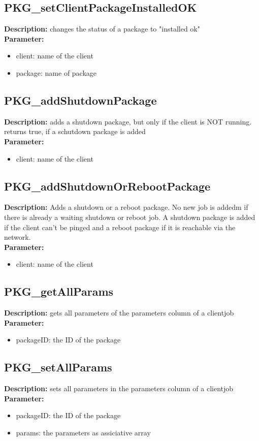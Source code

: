 \subsection{PKG\_setClientPackageInstalledOK}
\textbf{Description:} changes the status of a package to "installed ok"\\
\textbf{Parameter:}
\begin{itemize}
\item client: name of the client
\item package: name of package
\end{itemize}

\subsection{PKG\_addShutdownPackage}
\textbf{Description:} adds a shutdown package, but only if the client is NOT running. returns true, if a schutdown package is added\\
\textbf{Parameter:}
\begin{itemize}
\item client: name of the client
\end{itemize}

\subsection{PKG\_addShutdownOrRebootPackage}
\textbf{Description:} Adds a shutdown or a reboot package. No new job is addedm if there is already a waiting shutdown or reboot job. A shutdown package is added if the client can't be pinged and a reboot package if it is reachable via the network.\\
\textbf{Parameter:}
\begin{itemize}
\item client: name of the client
\end{itemize}

\subsection{PKG\_getAllParams}
\textbf{Description:} gets all parameters of the parameters column of a clientjob\\
\textbf{Parameter:}
\begin{itemize}
\item packageID: the ID of the package
\end{itemize}

\subsection{PKG\_setAllParams}
\textbf{Description:} sets all parameters in the parameters column of a clientjob\\
\textbf{Parameter:}
\begin{itemize}
\item packageID: the ID of the package
\item params: the parameters as assiciative array
\end{itemize}

